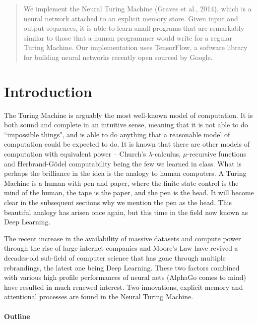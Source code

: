 \documentclass[12pt]{article}
\begin{document}
\maketitle

\begin{abstract}
We implement the Neural Turing Machine (Graves et al., 2014),
which is a neural network attached to an explicit memory store.
Given input and output sequences, it is able to learn small programs
that are remarkably similar to those that a human programmer would
write for a regular Turing Machine. Our implementation uses
TensorFlow, a software library for building neural networks
recently open sourced by Google.

\end{abstract}

\section{Introduction}

The Turing Machine is arguably the most well-known model of computation.
It is both sound and complete in an intuitive sense, meaning that it
is not able to do ``impossible things", and is able to do anything
that a reasonable model of computation could be expected to do.
It is known that there are other models of computation with equivalent
power -- Church's $\lambda$-calculus, $\mu$-recursive functions and
Herbrand-G\"odel computability being the few we learned in class. What
is perhaps the brilliance in the idea is the analogy to human computers.
A Turing Machine is a human with pen and paper, where the finite state
control is the mind of the human, the tape is the paper, and the pen is
the head. It will become clear in the subsequent sections why we
mention the pen as the head. This beautiful analogy has arisen once
again, but this time in the field now known as Deep Learning.

The recent increase in the availability of massive datasets and compute
power through the rise of large internet companies and Moore's Law have
revived a decades-old sub-field of computer science that has gone through
multiple rebrandings, the latest one being Deep Learning. These two
factors combined with various high profile performances of neural nets
(AlphaGo comes to mind) have resulted in much renewed interest. Two
innovations, explicit memory and attentional processes are found in
the Neural Turing Machine.

\paragraph{Outline}
\end{document}
